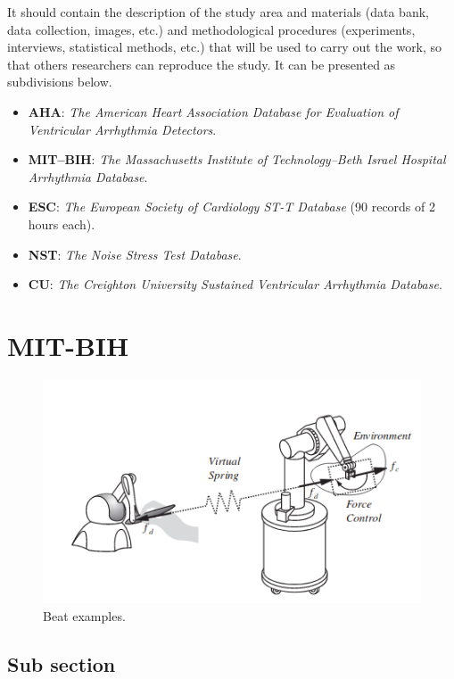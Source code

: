It should contain the description of the study area and materials (data bank, data collection, images, etc.) and methodological procedures (experiments, interviews, statistical methods, etc.) that will be used to carry out the work, so that others researchers can reproduce the study. It can be presented as subdivisions below.

\begin{itemize}
	\item \textbf{AHA}: \large \textit{The American Heart Association Database for Evaluation of Ventricular Arrhythmia Detectors}.
	\item \textbf{MIT–BIH}: \large \textit{The Massachusetts Institute of Technology–Beth Israel Hospital Arrhythmia Database}.
	\item \textbf{ESC}: \large \textit{The European Society of Cardiology ST-T Database} (90 records of 2 hours each).
	\item \textbf{NST}: \large \textit{The Noise Stress Test Database}.
	\item \textbf{CU}: \large \textit{The Creighton University Sustained Ventricular Arrhythmia Database}.
\end{itemize}

\section{MIT-BIH}

\begin{figure}[htb]
	\caption{Beat examples.}
	\begin{center}  
		\includegraphics[scale=0.6]{img/examples/haptic.png}
	\end{center}
	\label{fig_mitbih}
\end{figure}

\subsection{Sub section}

